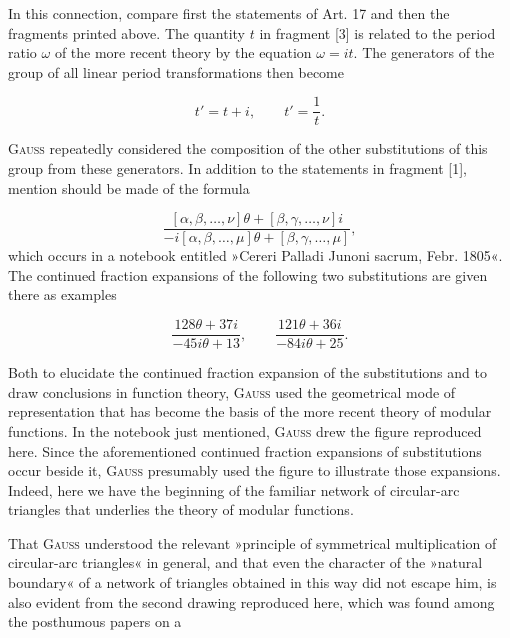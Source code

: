 In this connection, compare first the statements of Art. 17 and then the fragments printed above. The quantity $t$ in fragment [3] is related to the period ratio $\omega$ of the more recent theory by the equation $\omega = it$. The generators of the group of all linear period transformations then become

\[
t' = t+i, \qquad t' = \frac1t.
\]

\textsc{Gauss} repeatedly considered the composition of the other substitutions of this group from these generators. In addition to the statements in fragment [1], mention should be made of the formula

\[
\frac{[\alpha,\beta,\ldots,\nu]\theta+[\beta,\gamma,\ldots,\nu]i}{-i[\alpha,\beta,\ldots,\mu]\theta+[\beta,\gamma,\ldots,\mu]},
\]
which occurs in a notebook entitled »Cereri Palladi Junoni sacrum, Febr. 1805«. The continued fraction expansions of the following two substitutions are given there as examples

\[
\frac{128\theta+37i}{-45i\theta+13}, \qquad \frac{121\theta+36i}{-84i\theta+25}.
\]

Both to elucidate the continued fraction expansion of the substitutions and to draw conclusions in function theory, \textsc{Gauss} used the geometrical mode of representation that has become the basis of the more recent theory of modular functions. In the notebook just mentioned, \textsc{Gauss} drew the figure reproduced here. Since the aforementioned continued fraction expansions of substitutions occur beside it, \textsc{Gauss} presumably used the figure to illustrate those expansions. Indeed, here we have the beginning of the familiar network of circular-arc triangles that underlies the theory of modular functions.

\begin{center}\resizebox{9.7cm}{!}{}\end{center}

That \textsc{Gauss} understood the relevant »principle of symmetrical multiplication of circular-arc triangles« in general, and that even the character of the »natural boundary« of a network of triangles obtained in this way did not escape him, is also evident from the second drawing reproduced here, which was found among the posthumous papers on a

\begin{center}\resizebox{12.3cm}{!}{}\end{center}

